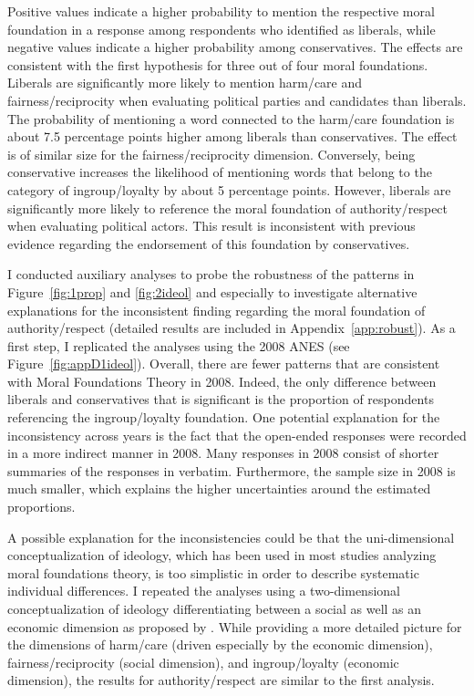 \documentclass[12pt]{article}
\begin{document}
Positive values indicate a higher probability to mention the respective moral foundation in a response among respondents who identified as liberals, while negative values indicate a higher probability among conservatives. The effects are consistent with the first hypothesis for three out of four moral foundations. Liberals are significantly more likely to mention harm/care and fairness/reciprocity when evaluating political parties and candidates than liberals. The probability of mentioning a word connected to the harm/care foundation is about 7.5 percentage points higher among liberals than conservatives. The effect is of similar size for the fairness/reciprocity dimension. Conversely, being conservative increases the likelihood of mentioning words that belong to the category of ingroup/loyalty by about 5 percentage points. However, liberals are significantly more likely to reference the moral foundation of authority/respect when evaluating political actors. This result is inconsistent with previous evidence regarding the endorsement of this foundation by conservatives. 

I conducted auxiliary analyses to probe the robustness of the patterns in Figure~\ref{fig:1prop} and \ref{fig:2ideol} and especially to investigate alternative explanations for the inconsistent finding regarding the moral foundation of authority/respect (detailed results are included in Appendix~\ref{app:robust}). As a first step, I replicated the analyses using the 2008 ANES (see Figure~\ref{fig:appD1ideol}). Overall, there are fewer patterns that are consistent with Moral Foundations Theory in 2008. Indeed, the only difference between liberals and conservatives that is significant is the proportion of respondents referencing the ingroup/loyalty foundation. One potential explanation for the inconsistency across years is the fact that the open-ended responses were recorded in a more indirect manner in 2008. Many responses in 2008 consist of shorter summaries of the responses in verbatim. Furthermore, the sample size in 2008 is much smaller, which explains the higher uncertainties around the estimated proportions.

A possible explanation for the inconsistencies could be that the uni-dimensional conceptualization of ideology, which has been used in most studies analyzing moral foundations theory, is too simplistic in order to describe systematic individual differences. I repeated the analyses using a two-dimensional conceptualization of ideology differentiating between a social as well as an economic dimension as proposed by \citet[see Figure~\ref{fig:appD2soceco}]{feldman2014understanding}. While providing a more detailed picture for the dimensions of harm/care (driven especially by the economic dimension), fairness/reciprocity (social dimension), and ingroup/loyalty (economic dimension), the results for authority/respect are similar to the first analysis.
\end{document}
